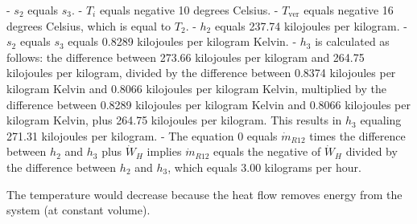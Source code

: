 - \( s_2 \) equals \( s_3 \).
- \( T_i \) equals negative 10 degrees Celsius.
- \( T_{\text{ver}} \) equals negative 16 degrees Celsius, which is equal to \( T_2 \).
- \( h_2 \) equals 237.74 kilojoules per kilogram.
- \( s_2 \) equals \( s_3 \) equals 0.8289 kilojoules per kilogram Kelvin.
- \( h_3 \) is calculated as follows: the difference between 273.66 kilojoules per kilogram and 264.75 kilojoules per kilogram, divided by the difference between 0.8374 kilojoules per kilogram Kelvin and 0.8066 kilojoules per kilogram Kelvin, multiplied by the difference between 0.8289 kilojoules per kilogram Kelvin and 0.8066 kilojoules per kilogram Kelvin, plus 264.75 kilojoules per kilogram. This results in \( h_3 \) equaling 271.31 kilojoules per kilogram.
- The equation \( 0 \) equals \( \dot{m}_{R12} \) times the difference between \( h_2 \) and \( h_3 \) plus \( \dot{W}_H \) implies \( \dot{m}_{R12} \) equals the negative of \( \dot{W}_H \) divided by the difference between \( h_2 \) and \( h_3 \), which equals 3.00 kilograms per hour.

The temperature would decrease because the heat flow removes energy from the system (at constant volume).